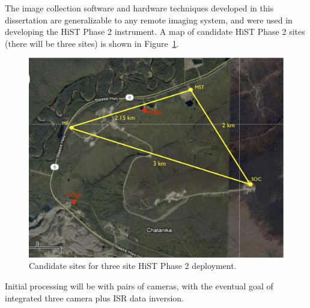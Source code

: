 The image collection software and hardware techniques developed in this dissertation are generalizable to any remote imaging system, and were used in developing the HiST Phase 2 instrument.
A map of candidate HiST Phase 2 sites (there will be three sites) is shown in Figure~\ref{fig:hist3}.
\begin{figure}
	\includegraphics[width=\linewidth]{gfx/Optical_Sites3}
	\caption{Candidate sites for three site HiST Phase 2 deployment.}
	\label{fig:hist3}
\end{figure}
Initial processing will be with pairs of cameras, with the eventual goal of integrated three camera plus ISR data inversion.

